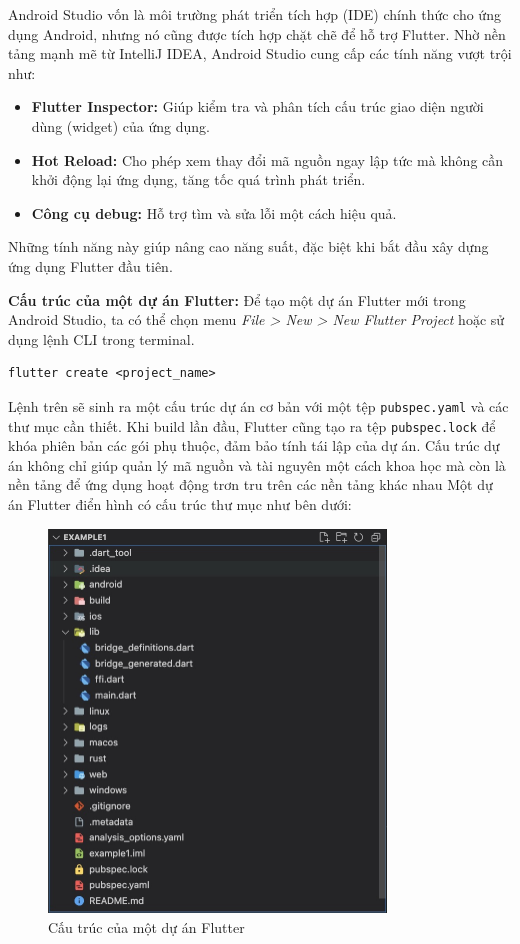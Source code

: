 \documentclass[../DoAn.tex]{subfiles}
\numberwithin{figure}{chapter}
\begin{document}
Android Studio vốn là môi trường phát triển tích hợp (IDE) chính thức cho ứng dụng Android, nhưng nó cũng được tích hợp chặt chẽ để hỗ trợ Flutter. Nhờ nền tảng mạnh mẽ từ IntelliJ IDEA, Android Studio cung cấp các tính năng vượt trội như:
\begin{itemize}
    \item \textbf{Flutter Inspector: } Giúp kiểm tra và phân tích cấu trúc giao diện người dùng (widget) của ứng dụng.
    \item \textbf{Hot Reload: } Cho phép xem thay đổi mã nguồn ngay lập tức mà không cần khởi động lại ứng dụng, tăng tốc quá trình phát triển.
    \item \textbf{Công cụ debug: } Hỗ trợ tìm và sửa lỗi một cách hiệu quả.
\end{itemize}

Những tính năng này giúp nâng cao năng suất, đặc biệt khi bắt đầu xây dựng ứng dụng Flutter đầu tiên.

\textbf{Cấu trúc của một dự án Flutter:}
Để tạo một dự án Flutter mới trong Android Studio, ta có thể chọn menu \textit{File > New > New Flutter Project} hoặc sử dụng lệnh CLI trong terminal.
\begin{lstlisting}
flutter create <project_name>
\end{lstlisting}

Lệnh trên sẽ sinh ra một cấu trúc dự án cơ bản với một tệp \texttt{pubspec.yaml} và các thư mục cần thiết. Khi build lần đầu, Flutter cũng tạo ra tệp \texttt{pubspec.lock} để khóa phiên bản các gói phụ thuộc, đảm bảo tính tái lập của dự án.
Cấu trúc dự án không chỉ giúp quản lý mã nguồn và tài nguyên một cách khoa học mà còn là nền tảng để ứng dụng hoạt động trơn tru trên các nền tảng khác nhau
Một dự án Flutter điển hình có cấu trúc thư mục như bên dưới:
\begin{figure}[H]
    \centering
    \includegraphics[width=0.8\textwidth]{Hinhve/Chuong5/flutterStructure.png}
    \caption{Cấu trúc của một dự án Flutter}
    \label{fig:flutterstructure}
\end{figure}
\end{document}

